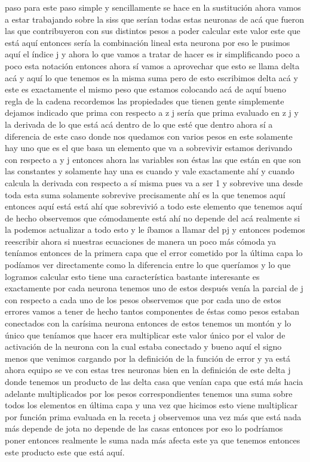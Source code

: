 paso para este paso simple y sencillamente se hace en la sustitución ahora vamos a estar trabajando sobre la siss que serían todas estas neuronas de acá que fueron las que contribuyeron con sus distintos pesos a poder calcular este valor este que está aquí entonces sería la combinación lineal esta neurona por eso le pusimos aquí el índice j y ahora lo que vamos a tratar de hacer es ir simplificando poco a poco esta notación entonces ahora sí vamos a aprovechar que esto se llama delta acá y aquí lo que tenemos es la misma suma pero de esto escribimos delta acá y este es exactamente el mismo peso que estamos colocando acá de aquí bueno regla de la cadena recordemos las propiedades que tienen gente simplemente dejamos indicado que prima con respecto a z j sería que prima evaluado en z j y la derivada de lo que está acá dentro de lo que esté que dentro ahora sí a diferencia de este caso donde nos quedamos con varios pesos en este solamente hay uno que es el que basa un elemento que va a sobrevivir estamos derivando con respecto a y j entonces ahora las variables son éstas las que están en que son las constantes y solamente hay una es cuando y vale exactamente ahí y cuando calcula la derivada con respecto a sí misma pues va a ser 1 y sobrevive una desde toda esta suma solamente sobrevive precisamente ahí es la que tenemos aquí entonces aquí está está ahí que sobrevivió a todo este elemento que tenemos aquí de hecho observemos que cómodamente está ahí no depende del acá realmente si la podemos actualizar a todo esto y le íbamos a llamar del pj y entonces podemos reescribir ahora si nuestras ecuaciones de manera un poco más cómoda ya teníamos entonces de la primera capa que el error cometido por la última capa lo podíamos ver directamente como la diferencia entre lo que queríamos y lo que logramos calcular esto tiene una característica bastante interesante es exactamente por cada neurona tenemos uno de estos después venía la parcial de j con respecto a cada uno de los pesos observemos que por cada uno de estos errores vamos a tener de hecho tantos componentes de éstas como pesos estaban conectados con la carísima neurona entonces de estos tenemos un montón y lo único que teníamos que hacer era multiplicar este valor único por el valor de activación de la neurona con la cual estaba conectado y bueno aquí el signo menos que venimos cargando por la definición de la función de error y ya está ahora equipo se ve con estas tres neuronas bien en la definición de este delta j donde tenemos un producto de las delta casa que venían capa que está más hacia adelante multiplicados por los pesos correspondientes tenemos una suma sobre todos los elementos en última capa y una vez que hicimos esto viene multiplicar por función prima evaluada en la receta j observemos una vez más que está nada más depende de jota no depende de las casas entonces por eso lo podríamos poner entonces realmente le suma nada más afecta este ya que tenemos entonces este producto este que está aquí.

